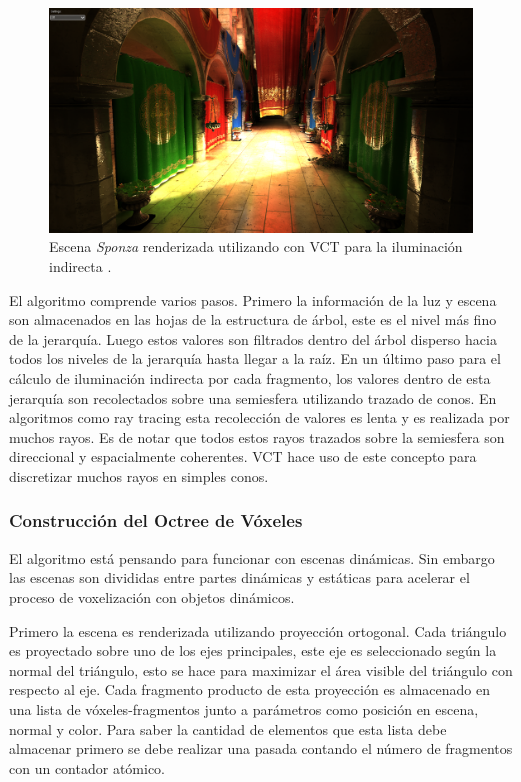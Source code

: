 \begin{figure}[H]
	\centering
	\includegraphics[width=0.9\linewidth]{media/givoxels_sponzanew1.png}
	\caption{Escena \emph{Sponza} renderizada utilizando con \acl{VCT} para la iluminación indirecta \cite{CNSGE11b}.}
	\label{fig:givoxels_sponzanew1}
\end{figure}

El algoritmo comprende varios pasos. Primero la información de la luz y escena son almacenados en las hojas de la estructura de árbol, este es el nivel más fino de la jerarquía. Luego estos valores son filtrados dentro del árbol disperso hacia todos los niveles de la jerarquía hasta llegar a la raíz. En un último paso para el cálculo de iluminación indirecta por cada fragmento, los valores dentro de esta jerarquía son recolectados sobre una semiesfera utilizando trazado de conos. En algoritmos como ray tracing esta recolección de valores es lenta y es realizada por muchos rayos. Es de notar que todos estos rayos trazados sobre la semiesfera son direccional y espacialmente coherentes. \ac{VCT} hace uso de este concepto para discretizar muchos rayos en simples conos.

\subsubsection{Construcción del Octree de Vóxeles}
El algoritmo está pensando para funcionar con escenas dinámicas. Sin embargo las escenas son divididas entre partes dinámicas y estáticas para acelerar el proceso de voxelización con objetos dinámicos.

Primero la escena es renderizada utilizando proyección ortogonal. Cada triángulo es proyectado sobre uno de los ejes principales, este eje es seleccionado según la normal del triángulo, esto se hace para maximizar el área visible del triángulo con respecto al eje. Cada fragmento producto de esta proyección es almacenado en una lista de vóxeles-fragmentos junto a parámetros como posición en escena, normal y color. Para saber la cantidad de elementos que esta lista debe almacenar primero se debe realizar una pasada contando el número de fragmentos con un contador atómico.

